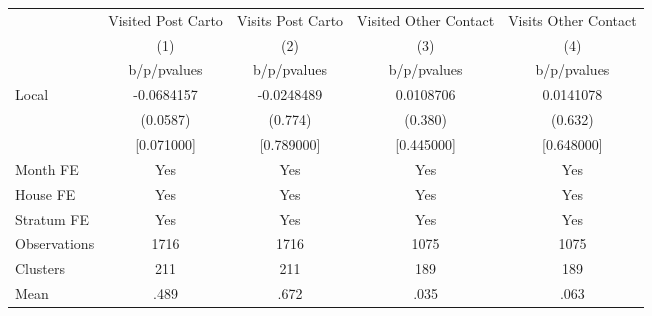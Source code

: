 {
\def\sym#1{\ifmmode^{#1}\else\(^{#1}\)\fi}
\begin{tabular}{l*{4}{c}}
\toprule
                &\multicolumn{1}{c}{Visited Post Carto}&\multicolumn{1}{c}{Visits Post Carto}&\multicolumn{1}{c}{Visited Other Contact}&\multicolumn{1}{c}{Visits Other Contact}\\
                &\multicolumn{1}{c}{(1)}&\multicolumn{1}{c}{(2)}&\multicolumn{1}{c}{(3)}&\multicolumn{1}{c}{(4)}\\
                &b/p/pvalues&b/p/pvalues&b/p/pvalues&b/p/pvalues\\
\midrule
Local           &-0.0684157&-0.0248489&0.0108706&0.0141078\\
                & (0.0587)&  (0.774)&  (0.380)&  (0.632)\\
                &[0.071000]&[0.789000]&[0.445000]&[0.648000]\\
Month FE        &      Yes&      Yes&      Yes&      Yes\\
House FE        &      Yes&      Yes&      Yes&      Yes\\
Stratum FE      &      Yes&      Yes&      Yes&      Yes\\
\midrule
Observations    &     1716&     1716&     1075&     1075\\
Clusters        &      211&      211&      189&      189\\
Mean            &     .489&     .672&     .035&     .063\\
\bottomrule
\end{tabular}
}
